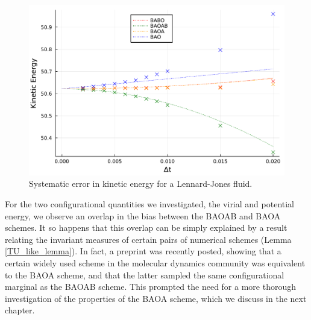   \begin{figure}[htbp]
    \begin{center}
      \includegraphics[width=0.7\linewidth]{figures/chapter1/kinetic_energy_bias.pdf}
      \caption{ \label{fig:kinetic_energy_bias}
        Systematic error in kinetic energy for a Lennard-Jones fluid.
      }
    \end{center}
  \end{figure}
For the two configurational quantities we investigated, the virial and potential energy, we observe an overlap in the bias between the BAOAB and BAOA schemes.
It so happens that this overlap can be simply explained by a result relating the invariant measures of certain pairs of numerical schemes (Lemma \ref{TU_like_lemma}).
In fact, a preprint \cite{KK22} was recently posted, showing that a certain widely used scheme in the molecular dynamics community was equivalent to the BAOA scheme, and that the latter sampled the same configurational marginal as the BAOAB scheme.
This prompted the need for a more thorough investigation of the properties of the BAOA scheme, which we discuss in the next chapter.